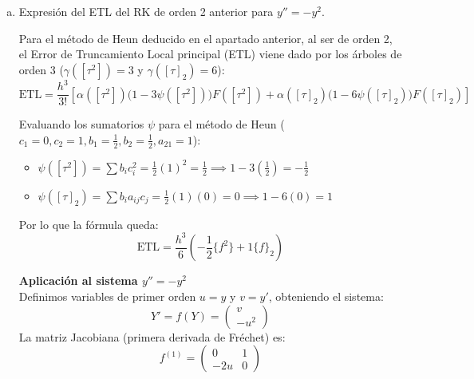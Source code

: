 \begin{enumerate}[a)]
\begin{sol}
\vspace{0.3cm}
\noindent \textbf{2. Controlador de paso (Step-size control):} \\
Como $b = \begin{pmatrix} \frac{1}{2} \\ \frac{1}{2} \end{pmatrix}$ y $\hat{b} = \begin{pmatrix} 1 \\ 0 \end{pmatrix}$, tenemos $E = b - \hat{b} = \begin{pmatrix} -\frac{1}{2} \\ \frac{1}{2} \end{pmatrix}$.$$\sum E_i k_i = -\frac{1}{2} k_1 + \frac{1}{2} k_2 = \frac{k_2 - k_1}{2}$$Sustituyendo en la fórmula de los apuntes:$$\mathbf{h_{nuevo} = \frac{\text{Tol}}{\frac{k_2 - k_1}{2}} = \frac{2 \cdot \text{Tol}}{k_2 - k_1}}$$
    \end{sol}
\item Expresión del ETL del RK de orden 2 anterior para $y'' = -y^2$.
\begin{sol}
Para el método de Heun deducido en el apartado anterior, al ser de orden 2, el Error de Truncamiento Local principal (ETL) viene dado por los árboles de orden 3 ($\gamma([\tau^2]) = 3$ y $\gamma([\tau]_2) = 6$):
\[
\text{ETL} = \frac{h^3}{3!} \left[ \alpha([\tau^2]) \big(1 - 3\psi([\tau^2])\big) F([\tau^2]) + \alpha([\tau]_2) \big(1 - 6\psi([\tau]_2)\big) F([\tau]_2) \right]
\]

Evaluando los sumatorios $\psi$ para el método de Heun ($c_1=0, c_2=1, b_1=\frac{1}{2}, b_2=\frac{1}{2}, a_{21}=1$):
\begin{itemize}
    \item $\psi([\tau^2]) = \sum b_i c_i^2 = \frac{1}{2}(1)^2 = \frac{1}{2} \implies 1 - 3\left(\frac{1}{2}\right) = -\frac{1}{2}$
    \item $\psi([\tau]_2) = \sum b_i a_{ij} c_j = \frac{1}{2}(1)(0) = 0 \implies 1 - 6(0) = 1$
\end{itemize}

Por lo que la fórmula queda:
\[
\text{ETL} = \frac{h^3}{6} \left( -\frac{1}{2} \{f^2\} + 1 \{f\}_2 \right)
\]

\vspace{0.3cm}
\noindent \textbf{Aplicación al sistema $y'' = -y^2$} \\
Definimos variables de primer orden $u = y$ y $v = y'$, obteniendo el sistema:
\[
Y' = f(Y) = \begin{pmatrix} v \\ -u^2 \end{pmatrix}
\]
La matriz Jacobiana (primera derivada de Fréchet) es:
\[
f^{(1)} = \begin{pmatrix} 0 & 1 \\ -2u & 0 \end{pmatrix}
\]


\end{sol}
\end{enumerate}
